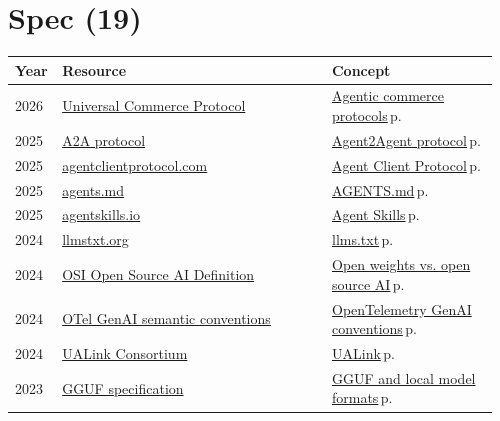 \documentclass[10pt,a4paper,openany]{report}
\begin{document}
\section{Spec (19)}
{\small\begin{longtable}{@{}p{0.07\linewidth}>{\raggedright}p{0.55\linewidth}>{\raggedright\arraybackslash}p{0.34\linewidth}@{}}
\textbf{\sffamily Year} & \textbf{\sffamily Resource} & \textbf{\sffamily Concept}\\ \hline\endhead
2026 & \href{https://ucp.dev}{Universal Commerce Protocol} & \hyperref[c:protocols-9]{Agentic commerce protocols}\,{\color{muted}\scriptsize p.\,\pageref{c:protocols-9}}\\
2025 & \href{https://a2a-protocol.org}{A2A protocol} & \hyperref[c:protocols-3]{Agent2Agent protocol}\,{\color{muted}\scriptsize p.\,\pageref{c:protocols-3}}\\
2025 & \href{https://agentclientprotocol.com}{agentclientprotocol.com} & \hyperref[c:protocols-7]{Agent Client Protocol}\,{\color{muted}\scriptsize p.\,\pageref{c:protocols-7}}\\
2025 & \href{https://agents.md}{agents.md} & \hyperref[c:protocols-6]{AGENTS.md}\,{\color{muted}\scriptsize p.\,\pageref{c:protocols-6}}\\
2025 & \href{https://agentskills.io}{agentskills.io} & \hyperref[c:protocols-5]{Agent Skills}\,{\color{muted}\scriptsize p.\,\pageref{c:protocols-5}}\\
2024 & \href{https://llmstxt.org}{llmstxt.org} & \hyperref[c:protocols-10]{llms.txt}\,{\color{muted}\scriptsize p.\,\pageref{c:protocols-10}}\\
2024 & \href{https://opensource.org/ai/open-source-ai-definition}{OSI Open Source AI Definition} & \hyperref[c:practice-7]{Open weights vs. open source AI}\,{\color{muted}\scriptsize p.\,\pageref{c:practice-7}}\\
2024 & \href{https://opentelemetry.io/docs/specs/semconv/gen-ai/}{OTel GenAI semantic conventions} & \hyperref[c:protocols-11]{OpenTelemetry GenAI conventions}\,{\color{muted}\scriptsize p.\,\pageref{c:protocols-11}}\\
2024 & \href{https://ualinkconsortium.org}{UALink Consortium} & \hyperref[c:hardware-3]{UALink}\,{\color{muted}\scriptsize p.\,\pageref{c:hardware-3}}\\
2023 & \href{https://github.com/ggml-org/ggml/blob/master/docs/gguf.md}{GGUF specification} & \hyperref[c:quant-5]{GGUF and local model formats}\,{\color{muted}\scriptsize p.\,\pageref{c:quant-5}}\\

\end{longtable}}
\end{document}
